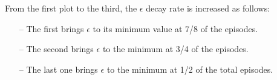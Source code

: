 \documentclass{article}
\begin{document}
From the first plot to the third, the $\epsilon$ decay rate is increased as follows:
\begin{itemize}
\item[--] The first brings $\epsilon$ to its minimum value at 7/8 of the episodes.
\item[--] The second brings $\epsilon$ to the minimum at 3/4 of the episodes.
\item[--] The last one brings $\epsilon$ to the minimum at 1/2 of the total episodes.
\end{itemize}

\begin{center}
\centering
{}
\end{center}


\begin{center}
\centering
{}
\end{center}


\begin{center}
\centering
{}
\end{center}
\end{document}
